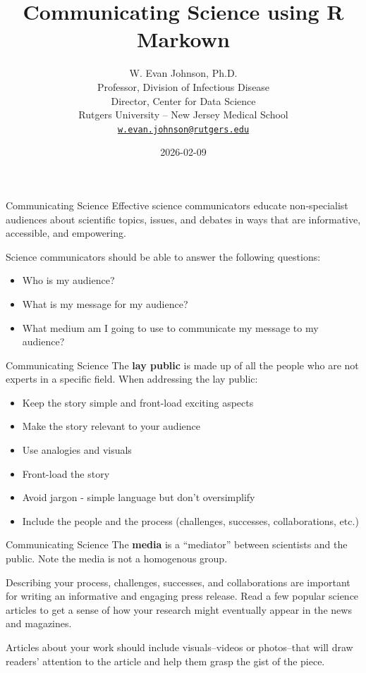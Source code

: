 \documentclass[
  ignorenonframetext,
  aspectratio=169]{beamer}
\title{Communicating Science using R Markown}
\author{W. Evan Johnson, Ph.D.\\
Professor, Division of Infectious Disease\\
Director, Center for Data Science\\
Rutgers University -- New Jersey Medical School\\
\href{mailto:w.evan.johnson@rutgers.edu}{\nolinkurl{w.evan.johnson@rutgers.edu}}}
\date{2026-02-09}
\providecommand{\tightlist}{%
  \setlength{\itemsep}{0pt}\setlength{\parskip}{0pt}}
\begin{document}
\frame{\titlepage}

\begin{frame}{Communicating Science}
\label{communicating-science}
Effective science communicators educate non-specialist audiences about
scientific topics, issues, and debates in ways that are informative,
accessible, and empowering.

Science communicators should be able to answer the following questions:

\begin{itemize}
\tightlist
\item
  Who is my audience?
\item
  What is my message for my audience?
\item
  What medium am I going to use to communicate my message to my
  audience?
\end{itemize}
\end{frame}

\begin{frame}{Communicating Science}
\label{communicating-science-1}
The \textbf{lay public} is made up of all the people who are not experts
in a specific field. When addressing the lay public:

\begin{itemize}
\tightlist
\item
  Keep the story simple and front-load exciting aspects
\item
  Make the story relevant to your audience
\item
  Use analogies and visuals
\item
  Front-load the story
\item
  Avoid jargon - simple language but don't oversimplify
\item
  Include the people and the process (challenges, successes,
  collaborations, etc.)
\end{itemize}
\end{frame}

\begin{frame}{Communicating Science}
\label{communicating-science-2}
The \textbf{media} is a ``mediator'' between scientists and the public.
Note the media is not a homogenous group.

Describing your process, challenges, successes, and collaborations are
important for writing an informative and engaging press release. Read a
few popular science articles to get a sense of how your research might
eventually appear in the news and magazines.

Articles about your work should include visuals--videos or photos--that
will draw readers' attention to the article and help them grasp the gist
of the piece.
\end{frame}
\end{document}
